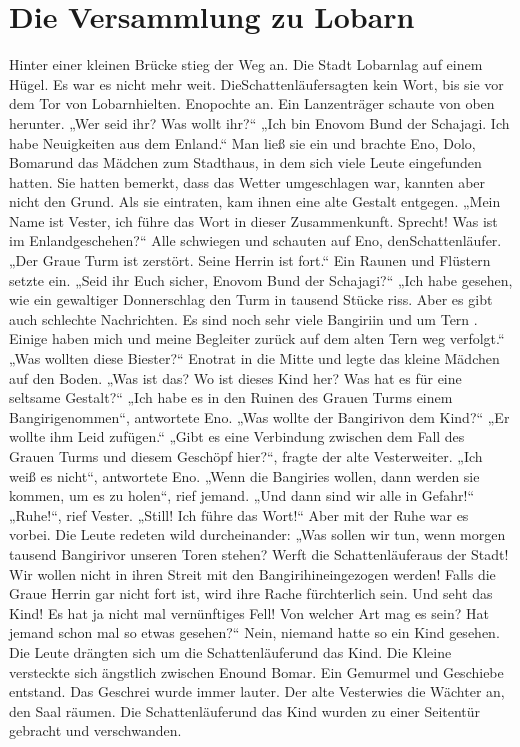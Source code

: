\documentclass[12pt,a4paper,onecolumn,twoside,ngerman]{book}
\newcommand{\Tern}{Tern }
\newcommand{\Bangiri}{Bangiri}
\newcommand{\Enland}{Enland}
\newcommand{\Schattenjager}{Schattenläufer}
\newcommand{\Eno}{Eno}
\newcommand{\Bomar}{Bomar}
\newcommand{\Do}{Dolo}
\newcommand{\Lobarn}{Lobarn}
\newcommand{\Vester}{Vester}
\begin{document}
\section{Die Versammlung zu \Lobarn}
Hinter einer kleinen Brücke stieg der Weg an. Die Stadt \Lobarn lag auf einem  Hügel. Es war es nicht mehr weit. Die\Schattenjager sagten kein Wort, bis sie vor dem Tor von \Lobarn hielten. \Eno pochte an.
Ein Lanzenträger schaute von oben herunter. 
„Wer seid ihr? Was wollt ihr?“
„Ich bin \Eno vom Bund der Schajagi. Ich habe Neuigkeiten aus dem \Enland.“ 
Man ließ sie ein und brachte \Eno, \Do, \Bomar und das Mädchen zum Stadthaus, in dem sich viele Leute eingefunden hatten. Sie hatten bemerkt, dass das Wetter umgeschlagen war, kannten aber nicht den Grund. Als sie eintraten, kam ihnen eine alte Gestalt entgegen. 
„Mein Name ist \Vester, ich führe das Wort in dieser Zusammenkunft. Sprecht! Was ist im \Enland geschehen?“
Alle schwiegen und schauten auf \Eno, den\Schattenjager.
„Der Graue Turm ist zerstört. Seine Herrin ist fort.“
Ein Raunen und Flüstern setzte ein.
„Seid ihr Euch sicher, \Eno vom Bund der Schajagi?“
„Ich habe gesehen, wie ein gewaltiger Donnerschlag den Turm in tausend Stücke riss. Aber es gibt auch schlechte Nachrichten. Es sind noch sehr viele \Bangiri in und um \Tern. Einige haben mich und meine Begleiter zurück auf dem alten \Tern{weg} verfolgt.“
„Was wollten diese Biester?“
\Eno trat in die Mitte und legte das kleine Mädchen auf den Boden.
„Was ist das? Wo ist dieses Kind her? Was hat es für eine seltsame Gestalt?“
„Ich habe es in den Ruinen des Grauen Turms einem \Bangiri genommen“, antwortete \Eno.
„Was wollte der \Bangiri von dem Kind?“
„Er wollte ihm Leid zufügen.“
„Gibt es eine Verbindung zwischen dem Fall des Grauen Turms und diesem Geschöpf hier?“, fragte der alte \Vester weiter.
„Ich weiß es nicht“, antwortete \Eno.
„Wenn die \Bangiri es wollen, dann werden sie kommen, um es zu holen“, rief jemand. „Und dann sind wir alle in Gefahr!“
„Ruhe!“, rief \Vester. „Still! Ich führe das Wort!“
Aber mit der Ruhe war es vorbei. Die Leute redeten wild durcheinander: „Was sollen wir tun, wenn morgen tausend \Bangiri vor unseren Toren stehen? Werft die \Schattenjager aus der Stadt! Wir wollen nicht in ihren Streit mit den \Bangiri hineingezogen werden! Falls die Graue Herrin gar nicht fort ist, wird ihre Rache fürchterlich sein. Und seht das Kind! Es hat ja nicht mal vernünftiges Fell! Von welcher Art mag es sein? Hat jemand schon mal so etwas gesehen?“
Nein, niemand hatte so ein Kind gesehen. Die Leute drängten sich um die \Schattenjager und das Kind. Die Kleine versteckte sich ängstlich zwischen \Eno und \Bomar. Ein Gemurmel und Geschiebe entstand. Das Geschrei wurde immer lauter. Der alte \Vester wies die Wächter an, den Saal räumen. Die \Schattenjager und das Kind wurden zu einer Seitentür gebracht und verschwanden.
\end{document}
